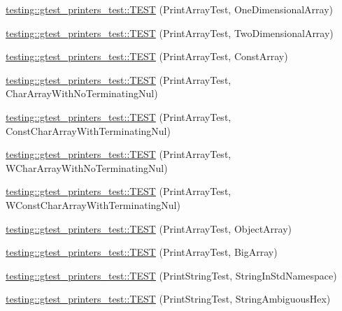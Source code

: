 \begin{DoxyCompactItemize}
\item 
\mbox{\hyperlink{namespacetesting_1_1gtest__printers__test_a3845c4717b03cb5ad309c7d9a37acb0a}{testing\+::gtest\+\_\+printers\+\_\+test\+::\+T\+E\+ST}} (Print\+Array\+Test, One\+Dimensional\+Array)
\item 
\mbox{\hyperlink{namespacetesting_1_1gtest__printers__test_ac366b9ec749b2499d21583d3b8f86273}{testing\+::gtest\+\_\+printers\+\_\+test\+::\+T\+E\+ST}} (Print\+Array\+Test, Two\+Dimensional\+Array)
\item 
\mbox{\hyperlink{namespacetesting_1_1gtest__printers__test_a8b5638f178c12f58707ca0f02a3b4d41}{testing\+::gtest\+\_\+printers\+\_\+test\+::\+T\+E\+ST}} (Print\+Array\+Test, Const\+Array)
\item 
\mbox{\hyperlink{namespacetesting_1_1gtest__printers__test_a3bae023a42049745b49fa1f2db9a0cb2}{testing\+::gtest\+\_\+printers\+\_\+test\+::\+T\+E\+ST}} (Print\+Array\+Test, Char\+Array\+With\+No\+Terminating\+Nul)
\item 
\mbox{\hyperlink{namespacetesting_1_1gtest__printers__test_ab51b9ecaca7d635326101b23d5e8afd2}{testing\+::gtest\+\_\+printers\+\_\+test\+::\+T\+E\+ST}} (Print\+Array\+Test, Const\+Char\+Array\+With\+Terminating\+Nul)
\item 
\mbox{\hyperlink{namespacetesting_1_1gtest__printers__test_ac19ec2732031bfe83b30ea9f00259ef3}{testing\+::gtest\+\_\+printers\+\_\+test\+::\+T\+E\+ST}} (Print\+Array\+Test, W\+Char\+Array\+With\+No\+Terminating\+Nul)
\item 
\mbox{\hyperlink{namespacetesting_1_1gtest__printers__test_a6a7cbcdbe748a1d4e90658f48f36c9da}{testing\+::gtest\+\_\+printers\+\_\+test\+::\+T\+E\+ST}} (Print\+Array\+Test, W\+Const\+Char\+Array\+With\+Terminating\+Nul)
\item 
\mbox{\hyperlink{namespacetesting_1_1gtest__printers__test_af91d8ad9d6c7547913fe05c7acc44114}{testing\+::gtest\+\_\+printers\+\_\+test\+::\+T\+E\+ST}} (Print\+Array\+Test, Object\+Array)
\item 
\mbox{\hyperlink{namespacetesting_1_1gtest__printers__test_a596493b56489aa1571fa26d1402e7116}{testing\+::gtest\+\_\+printers\+\_\+test\+::\+T\+E\+ST}} (Print\+Array\+Test, Big\+Array)
\item 
\mbox{\hyperlink{namespacetesting_1_1gtest__printers__test_abbd355e76033f0defd76c37523ad0f60}{testing\+::gtest\+\_\+printers\+\_\+test\+::\+T\+E\+ST}} (Print\+String\+Test, String\+In\+Std\+Namespace)
\item 
\mbox{\hyperlink{namespacetesting_1_1gtest__printers__test_ac20ee165500471e363011c3f664d2fb8}{testing\+::gtest\+\_\+printers\+\_\+test\+::\+T\+E\+ST}} (Print\+String\+Test, String\+Ambiguous\+Hex)

\end{DoxyCompactItemize}
